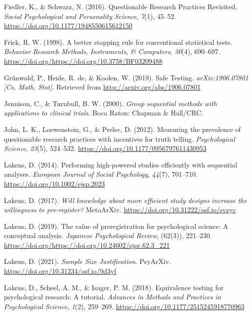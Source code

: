\documentclass[
  english,
  ,man,floatsintext]{apa6}
\newlength{\cslhangindent}
\newenvironment{cslreferences}%
  {\setlength{\parindent}{0pt}%
  \everypar{\setlength{\hangindent}{\cslhangindent}}\ignorespaces}%
  {\par}
\begin{document}
\begin{cslreferences}
\leavevmode\hypertarget{ref-fiedler_questionable_2016}{}%
Fiedler, K., \& Schwarz, N. (2016). Questionable Research Practices Revisited. \emph{Social Psychological and Personality Science}, \emph{7}(1), 45--52. \url{https://doi.org/10.1177/1948550615612150}

\leavevmode\hypertarget{ref-frick_better_1998}{}%
Frick, R. W. (1998). A better stopping rule for conventional statistical tests. \emph{Behavior Research Methods, Instruments, \& Computers}, \emph{30}(4), 690--697. \url{https://doi.org/https://doi.org/10.3758/BF03209488}

\leavevmode\hypertarget{ref-grunwald_safe_2019}{}%
Grünwald, P., Heide, R. de, \& Koolen, W. (2019). Safe Testing. \emph{arXiv:1906.07801 {[}Cs, Math, Stat{]}}. Retrieved from \url{http://arxiv.org/abs/1906.07801}

\leavevmode\hypertarget{ref-jennison_group_2000}{}%
Jennison, C., \& Turnbull, B. W. (2000). \emph{Group sequential methods with applications to clinical trials}. Boca Raton: Chapman \& Hall/CRC.

\leavevmode\hypertarget{ref-john_measuring_2012}{}%
John, L. K., Loewenstein, G., \& Prelec, D. (2012). Measuring the prevalence of questionable research practices with incentives for truth telling. \emph{Psychological Science}, \emph{23}(5), 524--532. \url{https://doi.org/10.1177/0956797611430953}

\leavevmode\hypertarget{ref-lakens_performing_2014}{}%
Lakens, D. (2014). Performing high-powered studies efficiently with sequential analyses. \emph{European Journal of Social Psychology}, \emph{44}(7), 701--710. \url{https://doi.org/10.1002/ejsp.2023}

\leavevmode\hypertarget{ref-lakens_will_2017}{}%
Lakens, D. (2017). \emph{Will knowledge about more efficient study designs increase the willingness to pre-register?} MetaArXiv. \url{https://doi.org/10.31222/osf.io/svzyc}

\leavevmode\hypertarget{ref-lakens_value_2019}{}%
Lakens, D. (2019). The value of preregistration for psychological science: A conceptual analysis. \emph{Japanese Psychological Review}, (62(3)), 221--230. \url{https://doi.org/https://doi.org/10.24602/sjpr.62.3_221}

\leavevmode\hypertarget{ref-lakens_sample_2021}{}%
Lakens, D. (2021). \emph{Sample Size Justification}. PsyArXiv. \url{https://doi.org/10.31234/osf.io/9d3yf}

\leavevmode\hypertarget{ref-lakens_equivalence_2018}{}%
Lakens, D., Scheel, A. M., \& Isager, P. M. (2018). Equivalence testing for psychological research: A tutorial. \emph{Advances in Methods and Practices in Psychological Science}, \emph{1}(2), 259--269. \url{https://doi.org/10.1177/2515245918770963}


\end{cslreferences}
\end{document}

